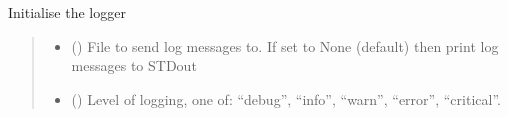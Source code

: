 \documentclass[letterpaper,10pt,english]{sphinxmanual}
\begin{document}
\begin{fulllineitems}
\label{\detokenize{misc:glomar_gridding.utils.init_logging}}
\pysigstartsignatures
\pysiglinewithargsret
{}
{\sphinxparamcomma {}}
{}
\pysigstopsignatures
\sphinxAtStartPar
Initialise the logger
\begin{quote}\begin{description}
\begin{itemize}
\item {}
\sphinxAtStartPar
{} () \textendash{} File to send log messages to. If set to None (default) then print log
messages to STDout

\item {}
\sphinxAtStartPar
{} () \textendash{} Level of logging, one of: “debug”, “info”, “warn”, “error”, “critical”.

\end{itemize}

\sphinxAtStartPar
{}

\end{description}\end{quote}

\end{fulllineitems}

\end{document}

